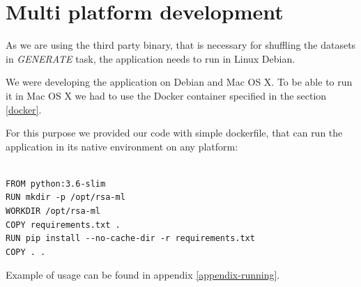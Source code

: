 \section{Multi platform development}

As we are using the third party binary, that is necessary for shuffling the datasets in \textit{GENERATE} task, the application needs to run in Linux Debian.

We were developing the application on Debian and Mac OS X. To be able to run it in Mac OS X we had to use the Docker container specified in the section \ref{docker}.

For this purpose we provided our code with simple dockerfile, that can run the application in its native environment on any platform:

\begin{verbatim}

FROM python:3.6-slim
RUN mkdir -p /opt/rsa-ml
WORKDIR /opt/rsa-ml
COPY requirements.txt .
RUN pip install --no-cache-dir -r requirements.txt
COPY . .

\end{verbatim}

\noindent
Example of usage can be found in appendix \ref{appendix-running}.